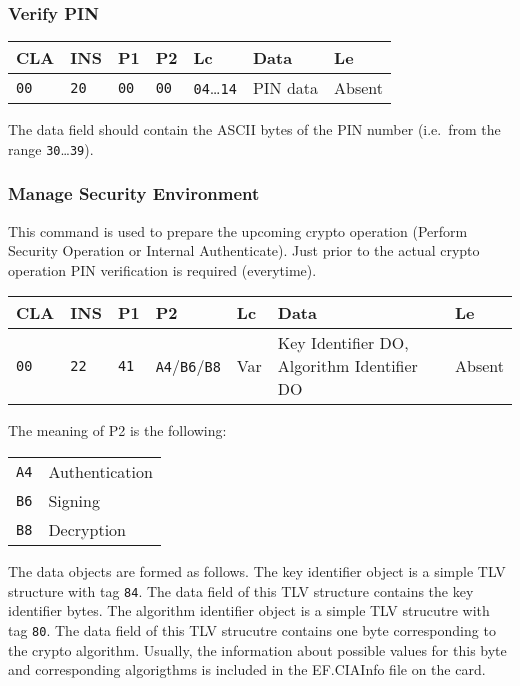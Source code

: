 \documentclass{article}
\begin{document}
\subsubsection{Verify PIN}

\begin{flushleft}
\begin{tabular}{|l|l|l|l|l|l|l|}
\hline
CLA & INS & P1 & P2 & Lc & Data & Le \\
\hline
\texttt{00} & \texttt{20} & \texttt{00} & \texttt{00} &
\texttt{04}\dots\texttt{14} & PIN data & Absent \\
\hline
\end{tabular}
\end{flushleft}
The data field should contain the ASCII bytes 
of the PIN number (i.e.\ from the range \texttt{30}\dots\texttt{39}).

\subsubsection{Manage Security Environment}

This command is used to prepare the upcoming crypto operation (Perform Security Operation or Internal
Authenticate). Just prior to the actual crypto operation PIN verification is required (everytime).
\begin{flushleft}
\begin{tabular}{|l|l|l|l|l|l|l|}
\hline
CLA & INS & P1 & P2 & Lc & Data & Le \\
\hline
\texttt{00} & \texttt{22} & \texttt{41} & \texttt{A4}/\texttt{B6}/\texttt{B8} &
Var & Key Identifier DO, Algorithm Identifier DO & Absent \\
\hline
\end{tabular}
\end{flushleft}
The meaning of P2 is the following:
\begin{flushleft}
\begin{tabular}{|l|l|}
\hline
\texttt{A4} & Authentication \\
\texttt{B6} & Signing \\
\texttt{B8} & Decryption \\
\hline
\end{tabular}
\end{flushleft}
The data objects are formed as follows. The key identifier object is a simple TLV structure with
tag \texttt{84}. The data field of this TLV structure contains the key identifier bytes.
The algorithm identifier object is a simple TLV strucutre with tag \texttt{80}. The data field of 
this TLV strucutre contains one byte corresponding to the crypto algorithm. Usually, the information about 
possible values for this byte and corresponding algorigthms is included in the EF.CIAInfo
file on the card.
\end{document}
